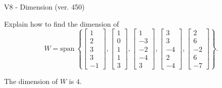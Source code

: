 \begin{exercise}
  \begin{exerciseTitle}V8 - Dimension (ver. 450)\end{exerciseTitle}
  \begin{exerciseStatement}
    Explain how to find the dimension of 
\[W=\mathrm{span}\ \left\{\left[\begin{array}{r}
1 \\
2 \\
3 \\
3 \\
-1
\end{array}\right] , \left[\begin{array}{r}
1 \\
0 \\
1 \\
1 \\
3
\end{array}\right] , \left[\begin{array}{r}
1 \\
-3 \\
-2 \\
-4 \\
3
\end{array}\right] , \left[\begin{array}{r}
3 \\
3 \\
-4 \\
2 \\
-4
\end{array}\right] , \left[\begin{array}{r}
2 \\
6 \\
-2 \\
6 \\
-7
\end{array}\right]\right\}.\]



  \end{exerciseStatement}
  \begin{exerciseAnswer}
   The dimension of \(W\) is  \(4\).
  


  \end{exerciseAnswer}
\end{exercise}